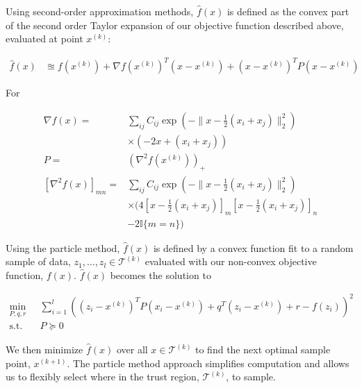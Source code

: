 \documentclass[10pt,twocolumn,letterpaper]{article}
\begin{document}
Using second-order approximation methods, $\hat{f}(x)$ is defined as the convex part of the second order Taylor expansion of our objective function described above, evaluated at point $x^{(k)}$:
\begin{small}
\begin{align*}
    \hat{f}(x) &\approxeq f(x^{(k)}) + \nabla f(x^{(k)})^T(x - x^{(k)}) + (x - x^{(k)})^T P (x - x^{(k)})
\end{align*}\end{small} 
For
\begin{small}\begin{align*}
    \nabla f(x) =& \sum_{ij} C_{ij} \exp\left(-\lVert x - \frac{1}{2}(x_i + x_j)\rVert ^2_2 \right)\\
    &\times \left(-2x + (x_i + x_j)\right)\\
    P =& \left(\nabla^2 f(x^{(k)})\right)_+\\
    \left[\nabla^2 f(x)\right]_{mn} =& \sum_{ij} C_{ij} \exp\left(-\lVert x - \frac{1}{2}(x_i + x_j)\rVert ^2_2 \right)\\
    &\times (4 \left[x - \frac{1}{2}(x_i + x_j)\right]_m \left[x - \frac{1}{2}(x_i + x_j)\right]_n\\
    &-2\mathbb{I}\{m = n\})
\end{align*}\end{small}

Using the particle method, $\hat{f}(x)$ is defined by a convex function fit to a random sample of data, $z_1, \dots, z_l \in \mathcal{T}^{(k)}$ evaluated with our non-convex objective function, $f(x)$. $\hat{f}(x)$ becomes the solution to
\begin{small}\begin{align*}
    \min_{P, q, r} \;\; & \sum_{i=1}^l \left((z_i - x^{(k)})^TP(x_i - x^{(k)}) + q^T(z_i - x^{(k)}) + r - f(z_i)\right)^2\\
    \textrm{s.t.} \quad & P \succeq 0
\end{align*}\end{small}

We then minimize $\hat{f}(x)$ over all $x \in \mathcal{T}^{(k)}$ to find the next optimal sample point, $x^{(k+1)}$. The particle method approach simplifies computation and allows us to flexibly select where in the trust region, $\mathcal{T}^{(k)}$, to sample.
\end{document}
